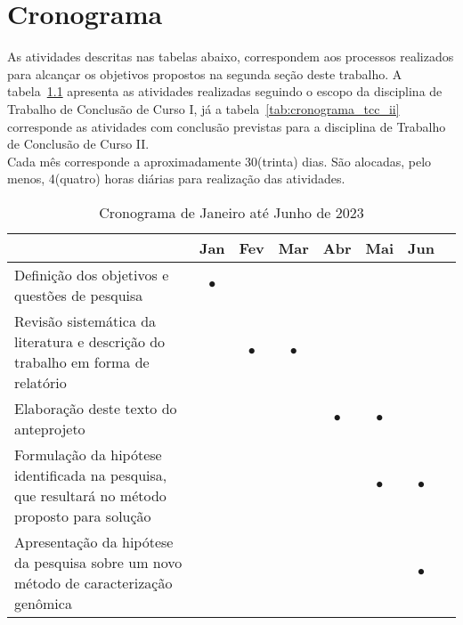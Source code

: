 \chapter{Cronograma}

As atividades descritas nas tabelas abaixo, correspondem aos processos realizados para alcançar os objetivos propostos na segunda seção deste trabalho.
A tabela~\ref{tab:cronograma_tcc_i} apresenta as atividades realizadas seguindo o escopo da disciplina de Trabalho de Conclusão de Curso I, já a tabela~\ref{tab:cronograma_tcc_ii} corresponde as atividades com conclusão previstas para a disciplina de Trabalho de Conclusão de Curso II.\space\\
Cada mês corresponde a aproximadamente 30(trinta) dias. São alocadas, pelo menos, 4(quatro) horas diárias para realização das atividades.

\begin{table}[hb]
        \centering
        \begin{tabular}{ p{7.8cm} c c c c c c c }
                \toprule
                 & Jan       & Fev       & Mar       & Abr       & Mai       & Jun       & \\
                \midrule
                Definição dos objetivos e questões de pesquisa
                 & $\bullet$ &           &           &           &           &           & \\
                \midrule
                Revisão sistemática da literatura e descrição do trabalho em forma de relatório
                 &           & $\bullet$ & $\bullet$ &           &           &           & \\
                \midrule
                Elaboração deste texto do anteprojeto
                 &           &           &           & $\bullet$ & $\bullet$ &           & \\
                \midrule
                Formulação da hipótese identificada na pesquisa, que resultará no método proposto para solução
                 &           &           &           &           & $\bullet$ & $\bullet$ & \\
                \midrule
                Apresentação da hipótese da pesquisa sobre um novo método de caracterização genômica
                 &           &           &           &           &           & $\bullet$ & \\

                \bottomrule
        \end{tabular}
        \caption{Cronograma de Janeiro até Junho de 2023}~\label{tab:cronograma_tcc_i}
\end{table}

